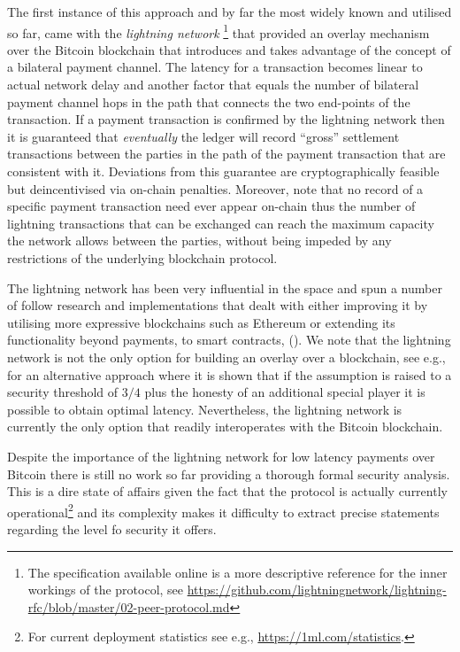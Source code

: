 The first instance of this approach and by far the most widely known and
utilised so far, 
came with the {\em lightning network } 
\cite{lightning}\footnote{The specification available online is a more descriptive reference for the inner workings of the protocol, see \url{https://github.com/lightningnetwork/lightning-rfc/blob/master/02-peer-protocol.md}} that provided an overlay mechanism over the Bitcoin blockchain that introduces and takes advantage of the concept of a bilateral payment channel. The latency for a transaction becomes linear to actual network delay and another factor that equals the number of bilateral payment channel hops in the path that  connects the two end-points of the transaction. If a payment  transaction is confirmed by the lightning network then  it is guaranteed that {\em eventually} the ledger will record ``gross'' settlement transactions between the parties in the path of the payment transaction that are consistent with it. Deviations from this guarantee are cryptographically feasible but deincentivised via on-chain penalties.   
Moreover, note that no record of a  specific payment transaction need ever appear on-chain 
thus the number of lightning transactions that can be  exchanged can reach the maximum capacity the network allows between the parties, without being impeded by any  restrictions of the underlying blockchain protocol. 

The lightning network has been very influential in the space and spun a number of follow research and implementations
that dealt with either improving it by utilising more 
expressive blockchains such as Ethereum \cite{sprites,perun} 
or extending its functionality beyond payments, to smart contracts, 
\cite{DBLP:conf/systor/LindNEKPS18} ().
We note that the lightning network is not the only option for building an overlay over a blockchain, see e.g.,  \cite{DBLP:conf/eurocrypt/PassS18} for an alternative approach where it is shown that if the assumption is raised to a security threshold of $3/4$ plus the honesty of an additional special player it is possible to obtain optimal latency. Nevertheless, the lightning network is currently the only option that readily interoperates with the Bitcoin blockchain. 

Despite the importance of the lightning network for low latency payments over Bitcoin there is still no work so far providing a thorough formal security analysis. 
This is a dire state of affairs given the fact that the protocol is actually currently operational\footnote{For current deployment statistics see e.g.,  \url{https://1ml.com/statistics}.}
and its complexity makes it difficulty to extract precise statements regarding the level fo security it offers. 

